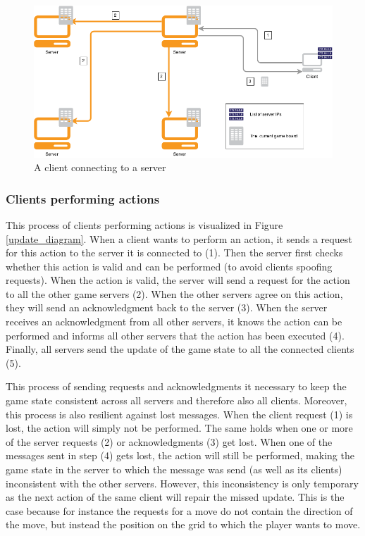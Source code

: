 \begin{figure}[h!]
  \centering
    \includegraphics[width=\textwidth]{diagrams/connecting-client}
    
  \caption{A client connecting to a server}
  \label{connect_diagram}
\end{figure}

\subsubsection*{Clients performing actions}
This process of clients performing actions is visualized in Figure \ref{update_diagram}. When a client wants to perform an action, it sends a request for this action to the server it is connected to (1). Then the server first checks whether this action is valid and can be performed (to avoid clients spoofing requests). When the action is valid, the server will send a request for the action to all the other game servers (2). When the other servers agree on this action, they will send an acknowledgment back to the server (3). When the server receives an acknowledgment from all other servers, it knows the action can be performed and informs all other servers that the action has been executed (4). Finally, all servers send the update of the game state to all the connected clients (5).

This process of sending requests and acknowledgments it necessary to keep the game state consistent across all servers and therefore also all clients. Moreover, this process is also resilient against lost messages. When the client request (1) is lost, the action will simply not be performed. The same holds when one or more of the server requests (2) or acknowledgments (3) get lost. When one of the messages sent in step (4) gets lost, the action will still be performed, making the game state in the server to which the message was send (as well as its clients) inconsistent with the other servers. However, this inconsistency is only temporary as the next action of the same client will repair the missed update. This is the case because for instance the requests for a move do not contain the direction of the move, but instead the position on the grid to which the player wants to move.

